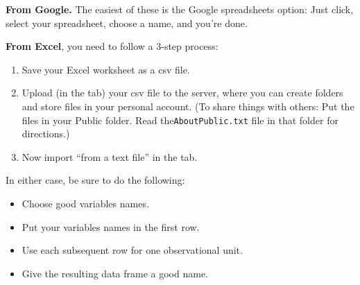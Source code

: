 
\textbf{From Google.}
The easiest of these is the Google spreadsheets option: Just click, select
your spreadsheet, choose a name, and you're done.

\textbf{From Excel},
you need to follow a 3-step process:
\begin{enumerate}
\item
Save your Excel worksheet as a csv file.
\item
Upload (in the  tab) your csv file to the server, where you can create folders and store
files in your personal account.  
(To share things with others: Put the files in your Public folder.  
Read the\texttt{AboutPublic.txt} file in that folder for directions.)
\item
Now import ``from a text file'' in the  tab.
\end{enumerate}

In either case, be sure to do the following:
\begin{itemize}
\item Choose good variables names.
\item Put your variables names in the first row.
\item Use each subsequent row for one observational unit.
\item Give the resulting data frame a good name.
\end{itemize}
%

